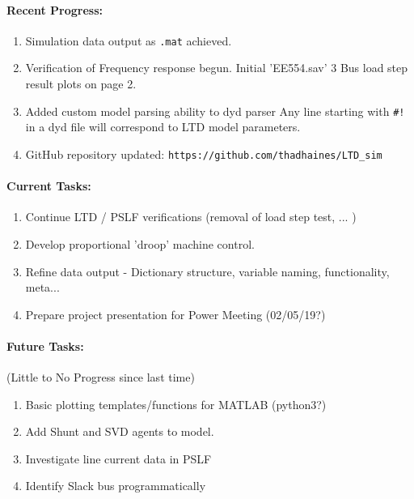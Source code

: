 \documentclass[12pt]{article}
\begin{document}
	\paragraph{Recent Progress:}
	\begin{enumerate}
		\item Simulation data output as \verb|.mat| achieved.
		
		\item Verification of Frequency response begun.
		\subitem Initial 'EE554.sav' 3 Bus load step result plots on page 2.
		
		\item Added custom model parsing ability to dyd parser
		\subitem Any line starting with \verb|#!| in a dyd file will correspond to LTD model parameters.
		
		\item GitHub repository updated:
		\subitem \verb|https://github.com/thadhaines/LTD_sim|
		
	\end{enumerate}
\paragraph{Current Tasks:}
	\begin{enumerate}
		\item Continue LTD / PSLF verifications (removal of load step test, ... )
		\item Develop proportional 'droop' machine control.		
		\item Refine data output - Dictionary structure, variable naming, functionality, meta...
		\item Prepare project presentation for Power Meeting (02/05/19?)
	\end{enumerate}
\paragraph{Future Tasks:}(Little to No Progress since last time)
	\begin{enumerate}
		
		\item Basic plotting templates/functions for MATLAB (python3?)
		
		\item Add Shunt and SVD agents to model. 
		
		\item Investigate line current data in PSLF
		
		\item Identify Slack bus programmatically
		
	\end{enumerate}
\end{document}
